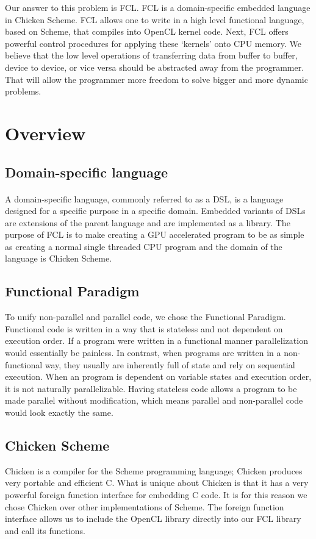 \documentclass{article}
\begin{document}
Our answer to this problem is FCL. FCL is a domain-specific embedded language in
Chicken Scheme. FCL allows one to write in a high level functional language, based
 on Scheme, that compiles into OpenCL kernel code. Next, FCL offers powerful
control procedures for applying these `kernels' onto CPU memory. We believe that
the low level operations of transferring data from buffer to buffer,
device to device, or vice versa should be abstracted away from the programmer.
That will allow the programmer more freedom to solve bigger and more dynamic problems.

\section{Overview}

\subsection{Domain-specific language}
\paragraph{}
A domain-specific language, commonly referred to as a DSL, is a language designed
for a specific purpose in a specific domain. Embedded variants of DSLs are
extensions of the parent language and are implemented as a library. The purpose
 of FCL is to make creating a GPU accelerated program to be as simple as creating a normal
single threaded CPU program and the domain of the language is Chicken Scheme.

\subsection{Functional Paradigm}
To unify non-parallel and parallel code, we chose the Functional Paradigm.
Functional code is written in a way that is stateless and not dependent on
execution order. If a program were written in a functional manner parallelization
would essentially be painless. In contrast, when programs are written in a non-functional way, they
usually are inherently full of state and rely on sequential execution. When an
program is dependent on variable states and execution order, it is not naturally
parallelizable. Having stateless code allows a program to be made parallel without
modification, which means parallel and non-parallel code would look exactly the
same.

\subsection{Chicken Scheme}
Chicken is a compiler for the Scheme programming language;
Chicken produces very portable and efficient C. What is unique about Chicken is
that it has a very powerful foreign function interface for embedding C code. It
is for this reason we chose Chicken over other implementations of Scheme. The
foreign function interface allows us to include the OpenCL library directly into
our FCL library and call its functions.
\end{document}
